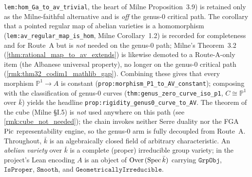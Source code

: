 \texttt{lem:hom_Ga_to_av_trivial}, the heart of Milne Proposition~3.9) is retained only as the
Milne-faithful alternative and is \emph{off} the genus-\(0\) critical path. The corollary that a
pointed regular map of abelian
varieties is a homomorphism (\texttt{lem:av_regular_map_is_hom}, Milne Corollary~1.2) is recorded
for completeness and for Route~A but is \emph{not} needed on the genus-\(0\) path; Milne's
Theorem~3.2 (\cref{thm:rational_map_to_av_extends}) is likewise demoted to a Route-A-only item
(the Albanese universal property), no longer on the genus-\(0\) critical path
(\cref{rmk:thm32_codim1_mathlib_gap}). Combining these
gives that every morphism \(\mathbb P^1 \to A\) is constant
(\texttt{prop:morphism_P1_to_AV_constant}); composing with the classification of genus-\(0\)
curves (\texttt{thm:genus_zero_curve_iso_p1}, \(C \cong \mathbb P^1\) over \(\bar k\)) yields the
headline \texttt{prop:rigidity_genus0_curve_to_AV}. The theorem of the cube (Milne \S I.5) is
\emph{not} used anywhere on this path (see \cref{rmk:cube_not_needed}); the chain invokes
neither Serre duality nor the FGA \(\operatorname{Pic}\) representability engine, so the genus-\(0\) arm is
fully decoupled from Route~A.
\medskip
Throughout, \(\bar k\) is an algebraically closed field of arbitrary characteristic. An
\emph{abelian variety} over \(\bar k\) is a complete (proper) irreducible group variety; in the
project's Lean encoding \(A\) is an object of \(\mathrm{Over}\,(\operatorname{Spec} \bar k)\) carrying
\(\mathtt{GrpObj}\), \(\mathtt{IsProper}\), \(\mathtt{Smooth}\), and \(\mathtt{GeometricallyIrreducible}\).
